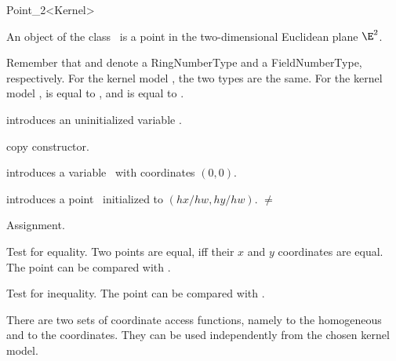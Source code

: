 \begin{ccRefClass} {Point_2<Kernel>}

\ccDefinition
An object of the class \ccRefName\ is a point in the two-dimensional
Euclidean plane $\E^2$. 

Remember that  and  denote a
RingNumberType and a FieldNumberType, respectively. For the kernel
model , the two types are the same. For the
kernel model ,  is equal
to , and  is equal to
.

\ccTypes
{}
\ccThreeToTwo


\ccCreation
{}


\ccHidden {}
             {introduces an uninitialized variable \ccVar.}

\ccHidden {}
            {copy constructor.}

            {introduces a variable \ccVar\ with  coordinates
              $(0,0)$.}

            {introduces a point \ccVar\ initialized to $(hx/hw,hy/hw)$.
             \ccPrecond {} $\neq$  }


\ccOperations

\ccHidden {}
        {Assignment.}

       {Test for equality. Two points are equal, iff their $x$ and $y$ 
        coordinates are equal. The point can be compared with
                .}

       {Test for inequality. The point can be compared with .}

There are two sets of coordinate access functions, namely to the
homogeneous and to the  coordinates. They can be used
independently from the chosen kernel model.


\end{ccRefClass}
